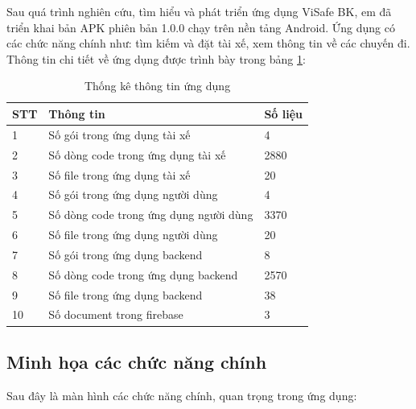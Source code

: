 \documentclass[../DoAn.tex]{subfiles}
\begin{document}
Sau quá trình nghiên cứu, tìm hiểu và phát triển ứng dụng ViSafe BK, em đã triển khai bản APK phiên 
bản 1.0.0 chạy trên nền tảng Android. Ứng dụng có các chức năng chính như: tìm kiếm và đặt tài xế, xem thông tin về các chuyến đi.
Thông tin chi tiết về ứng dụng được trình bày trong bảng \ref{tab:thong_ke_thong_tin_ung_dung}:
\begin{table}[H]
    \centering
    \begin{tabular}{|l|l|l|}
    \hline
    \textbf{STT} & \textbf{Thông tin}                     & \textbf{Số liệu} \\ \hline
    1            & Số gói trong ứng dụng tài xế           & 4                \\ \hline
    2            & Số dòng code trong ứng dụng tài xế     & 2880             \\ \hline
    3            & Số file trong ứng dụng tài xế          & 20               \\ \hline
    4            & Số gói trong ứng dụng người dùng       & 4                \\ \hline
    5            & Số dòng code trong ứng dụng người dùng & 3370             \\ \hline
    6            & Số file trong ứng dụng người dùng      & 20               \\ \hline
    7            & Số gói trong ứng dụng backend          & 8                \\ \hline
    8            & Số dòng code trong ứng dụng backend    & 2570             \\ \hline
    9            & Số file trong ứng dụng backend         & 38               \\ \hline
    10           & Số document trong firebase             & 3                \\ \hline
    \end{tabular}
    \caption{Thống kê thông tin ứng dụng}
    \label{tab:thong_ke_thong_tin_ung_dung}
\end{table}
\subsection{Minh họa các chức năng chính}
Sau đây là màn hình các chức năng chính, quan trọng trong ứng dụng:
\end{document}
